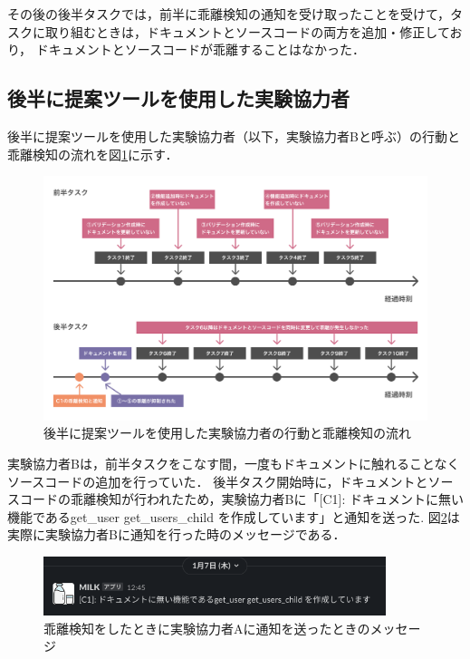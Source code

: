 その後の後半タスクでは，前半に乖離検知の通知を受け取ったことを受けて，タスクに取り組むときは，ドキュメントとソースコードの両方を追加・修正しており，
ドキュメントとソースコードが乖離することはなかった．

\subsection{後半に提案ツールを使用した実験協力者}
後半に提案ツールを使用した実験協力者（以下，実験協力者Bと呼ぶ）の行動と乖離検知の流れを図\ref{userb}に示す．
\begin{figure}[H]
    \centering
    \includegraphics[width=14cm]{images/userb.png}
    \caption{後半に提案ツールを使用した実験協力者の行動と乖離検知の流れ}
    \label{userb}
\end{figure}

実験協力者Bは，前半タスクをこなす間，一度もドキュメントに触れることなくソースコードの追加を行っていた．
後半タスク開始時に，ドキュメントとソースコードの乖離検知が行われたため，実験協力者Bに「[C1]: ドキュメントに無い機能であるget\_user get\_users\_child を作成しています」と通知を送った.
図\ref{notification2}は実際に実験協力者Bに通知を行った時のメッセージである．

\begin{figure}[H]
    \centering
    \includegraphics[width=10cm]{images/notification2.png}
    \caption{乖離検知をしたときに実験協力者Aに通知を送ったときのメッセージ}
    \label{notification2}
\end{figure}

